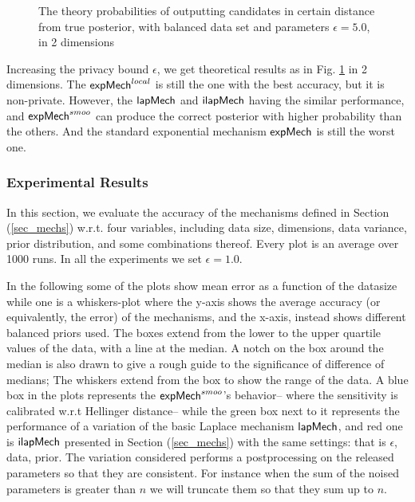 \documentclass{article}
\begin{document}
\begin{figure}
\begin{center}
\centering
\caption{The theory probabilities of outputting candidates in certain distance from true posterior, with balanced data set and parameters $\epsilon = 5.0$, in 2 dimensions}
\label{fig_theory_epsilon}
\end{center}
\end{figure}

Increasing the privacy bound $\epsilon$, we get theoretical results as in Fig. \ref{fig_theory_epsilon} in 2 dimensions. The $\mathsf{expMech}^{local}$ is still the one with the best accuracy, but it is non-private. However, the $\mathsf{lapMech}$ and $\mathsf{ilapMech}$ having the similar performance, and $\mathsf{expMech}^{smoo}$ can produce the correct posterior with higher probability than the others. And the standard exponential mechanism $\mathsf{expMech}$ is still the worst one.


\subsubsection{Experimental Results}
\label{subsec_vs_variables}

In this section, we evaluate the accuracy of the mechanisms defined in
Section (\ref{sec_mechs}) w.r.t. four variables, including data size, dimensions,
data variance, prior distribution, and some combinations thereof.
Every plot is an average over 1000 runs. In all the experiments we set
$\epsilon = 1.0$.

\noindent In the following some of the plots show
mean error as a function of the datasize while one
is a whiskers-plot where the y-axis shows the average
accuracy (or equivalently, the error) of the mechanisms, and the x-axis, instead shows
different balanced priors used. The boxes extend from the lower to the upper quartile values
of the data, with a line at the median. A notch on the box around the
median is also drawn to give a rough guide to the significance of
difference of medians; The whiskers extend from the box to show the
range of the data. A blue box in the plots represents the $\mathsf{expMech}^{smoo}$'s behavior-- where the sensitivity is calibrated
w.r.t Hellinger distance-- while the green box next to
it represents the performance of a variation of the basic Laplace
mechanism $\mathsf{lapMech}$, and red one is $\mathsf{ilapMech}$ presented in Section (\ref{sec_mechs}) with the same
settings: that is $\epsilon$, data, prior. The variation
considered performs a postprocessing on the released parameters so
that they are consistent. For instance when the sum of the noised
parameters is greater than $n$ we will truncate them so that they sum
up to $n$.
\end{document}
